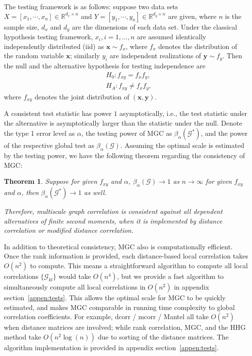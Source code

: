 \documentclass[11pt]{article}
\providecommand{\mb}[1]{\boldsymbol{#1}}
\newcommand{\Real}{\mathbb{R}}
\newcommand{\G}{\mathcal{G}}
\newtheorem{thm}{Theorem}
\begin{document}
The testing framework is as follows: suppose two data sets $X=[x_{1},\cdots, x_{n}] \in \Real^{d_{x} \times n}$ and $Y=[y_{1},\cdots, y_{n}] \in \Real^{d_{y} \times n}$ are given, where $n$ is the sample size, $d_{x}$ and $d_{y}$ are the dimensions of each data set. Under the classical hypothesis testing framework, $x_{i}, i=1,\ldots,n$ are assumed identically independently distributed (iid) as $\mb{x} \sim f_{x}$, where $f_{x}$ denotes the distribution of the random variable $\mb{x}$; similarly $y_{i}$ are independent realizations of $\mb{y} \sim f_{y}$. Then the null and the alternative hypothesis for testing independence are
\begin{align*}
& H_{0}: f_{xy}=f_{x}f_{y},\\
& H_{A}: f_{xy} \neq f_{x}f_{y},
\end{align*}
where $f_{xy}$ denotes the joint distribution of $(\mb{x},\mb{y})$. 

A consistent test statistic has power $1$ asymptotically, i.e., the test statistic under the alternative is asymptotically larger than the statistic under the null. Denote the type 1 error level as $\alpha$, the testing power of MGC as $\beta_{\alpha}(\G^{*})$, and the power of the respective global test as $\beta_{\alpha}(\G)$. Assuming the optimal scale is estimated by the testing power, we have the following theorem regarding the consistency of MGC:
\begin{thm}
\label{thm1}
Suppose for given $f_{xy}$ and $\alpha$, $\beta_{\alpha}(\G) \rightarrow 1$ as $n \rightarrow \infty$ for given $f_{xy}$ and $\alpha$, then $\beta_{\alpha}(\G^{*}) \rightarrow 1$ as well.

Therefore, multiscale graph correlation is consistent against all dependent alternatives of finite second moments, when it is implemented by distance correlation or modified distance correlation.
\end{thm}


In addition to theoretical consistency, MGC also is computationally efficient. Once the rank information is provided, each distance-based local correlation takes $O(n^2)$ to compute. This means a straightforward algorithm to compute all local correlations $\{\G_{kl}\}$ would take $O(n^4)$, but we provide a fast algorithm to simultaneously compute all local correlations in $O(n^2)$ in appendix section~\ref{appen:tests}. This allows the optimal scale for MGC to be quickly estimated, and makes MGC comparable in running time complexity to global correlation coefficients. For example, dcorr / mcorr / Mantel all take $O(n^2)$ when distance matrices are involved; while rank correlation, MGC, and the HHG method take $O(n^2\log(n))$ due to sorting of the distance matrices. The algorithm implementation is provided in appendix section~\ref{appen:tests}.
\end{document}
